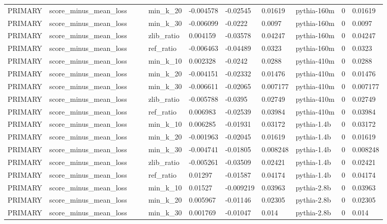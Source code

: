 \begin{tabular}{lllllllllll}
PRIMARY & score\_minus\_mean\_loss &  &  & min\_k\_20 & -0.004578 & -0.02545 & 0.01619 & pythia-160m & 0 & 0.01619 \\
PRIMARY & score\_minus\_mean\_loss &  &  & min\_k\_30 & -0.006099 & -0.0222 & 0.0097 & pythia-160m & 0 & 0.0097 \\
PRIMARY & score\_minus\_mean\_loss &  &  & zlib\_ratio & 0.004159 & -0.03578 & 0.04247 & pythia-160m & 0 & 0.04247 \\
PRIMARY & score\_minus\_mean\_loss &  &  & ref\_ratio & -0.006463 & -0.04489 & 0.0323 & pythia-160m & 0 & 0.0323 \\
PRIMARY & score\_minus\_mean\_loss &  &  & min\_k\_10 & 0.002328 & -0.0242 & 0.0288 & pythia-410m & 0 & 0.0288 \\
PRIMARY & score\_minus\_mean\_loss &  &  & min\_k\_20 & -0.004151 & -0.02332 & 0.01476 & pythia-410m & 0 & 0.01476 \\
PRIMARY & score\_minus\_mean\_loss &  &  & min\_k\_30 & -0.006611 & -0.02065 & 0.007177 & pythia-410m & 0 & 0.007177 \\
PRIMARY & score\_minus\_mean\_loss &  &  & zlib\_ratio & -0.005788 & -0.0395 & 0.02749 & pythia-410m & 0 & 0.02749 \\
PRIMARY & score\_minus\_mean\_loss &  &  & ref\_ratio & 0.006983 & -0.02539 & 0.03984 & pythia-410m & 0 & 0.03984 \\
PRIMARY & score\_minus\_mean\_loss &  &  & min\_k\_10 & 0.006285 & -0.01931 & 0.03172 & pythia-1.4b & 0 & 0.03172 \\
PRIMARY & score\_minus\_mean\_loss &  &  & min\_k\_20 & -0.001963 & -0.02045 & 0.01619 & pythia-1.4b & 0 & 0.01619 \\
PRIMARY & score\_minus\_mean\_loss &  &  & min\_k\_30 & -0.004741 & -0.01805 & 0.008248 & pythia-1.4b & 0 & 0.008248 \\
PRIMARY & score\_minus\_mean\_loss &  &  & zlib\_ratio & -0.005261 & -0.03509 & 0.02421 & pythia-1.4b & 0 & 0.02421 \\
PRIMARY & score\_minus\_mean\_loss &  &  & ref\_ratio & 0.01297 & -0.01587 & 0.04174 & pythia-1.4b & 0 & 0.04174 \\
PRIMARY & score\_minus\_mean\_loss &  &  & min\_k\_10 & 0.01527 & -0.009219 & 0.03963 & pythia-2.8b & 0 & 0.03963 \\
PRIMARY & score\_minus\_mean\_loss &  &  & min\_k\_20 & 0.005967 & -0.01146 & 0.02305 & pythia-2.8b & 0 & 0.02305 \\
PRIMARY & score\_minus\_mean\_loss &  &  & min\_k\_30 & 0.001769 & -0.01047 & 0.014 & pythia-2.8b & 0 & 0.014 \\

\end{tabular}
